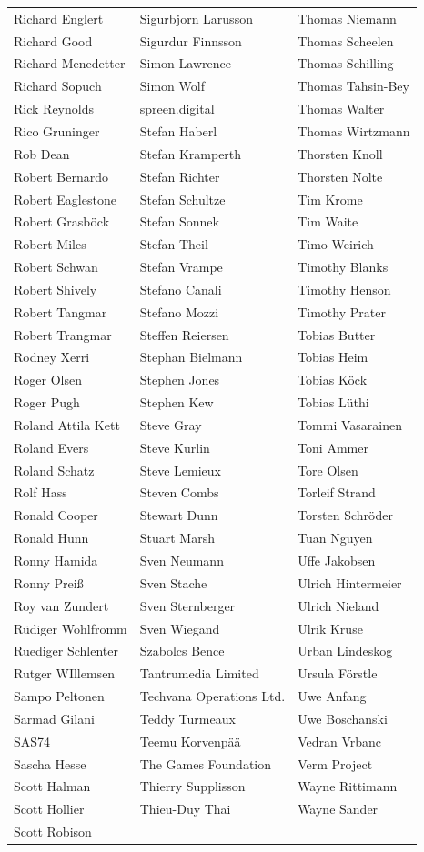 \begin{small}
\begin{tabular}{p{4cm}p{4cm}p{4cm}}
Richard Englert & Sigurbjorn Larusson & Thomas Niemann \\Richard Good & Sigurdur Finnsson & Thomas Scheelen \\Richard Menedetter & Simon Lawrence & Thomas Schilling \\Richard Sopuch & Simon Wolf & Thomas Tahsin-Bey \\Rick Reynolds & spreen.digital & Thomas Walter \\Rico Gruninger & Stefan Haberl & Thomas Wirtzmann \\Rob Dean & Stefan Kramperth & Thorsten Knoll \\Robert Bernardo & Stefan Richter & Thorsten Nolte \\Robert Eaglestone & Stefan Schultze & Tim Krome \\Robert Grasböck & Stefan Sonnek & Tim Waite \\Robert Miles & Stefan Theil & Timo Weirich \\Robert Schwan & Stefan Vrampe & Timothy Blanks \\Robert Shively & Stefano Canali & Timothy Henson \\Robert Tangmar & Stefano Mozzi & Timothy Prater \\Robert Trangmar & Steffen Reiersen & Tobias Butter \\Rodney Xerri & Stephan Bielmann & Tobias Heim \\Roger Olsen & Stephen Jones & Tobias Köck \\Roger Pugh & Stephen Kew & Tobias Lüthi \\Roland Attila Kett & Steve Gray & Tommi Vasarainen \\Roland Evers & Steve Kurlin & Toni Ammer \\Roland Schatz & Steve Lemieux & Tore Olsen \\Rolf Hass & Steven Combs & Torleif Strand \\Ronald Cooper & Stewart Dunn & Torsten Schröder \\Ronald Hunn & Stuart Marsh & Tuan Nguyen \\Ronny Hamida & Sven Neumann & Uffe Jakobsen \\Ronny Preiß & Sven Stache & Ulrich Hintermeier \\Roy van Zundert & Sven Sternberger & Ulrich Nieland \\Rüdiger Wohlfromm & Sven Wiegand & Ulrik Kruse \\Ruediger Schlenter & Szabolcs Bence & Urban Lindeskog \\Rutger WIllemsen & Tantrumedia Limited & Ursula Förstle \\Sampo Peltonen & Techvana Operations Ltd. & Uwe Anfang \\Sarmad Gilani & Teddy Turmeaux & Uwe Boschanski \\SAS74 & Teemu Korvenpää & Vedran Vrbanc \\Sascha Hesse & The Games Foundation & Verm Project \\Scott Halman & Thierry Supplisson & Wayne Rittimann \\Scott Hollier & Thieu-Duy Thai & Wayne Sander \\Scott Robison 
\end{tabular}
\end{small}
